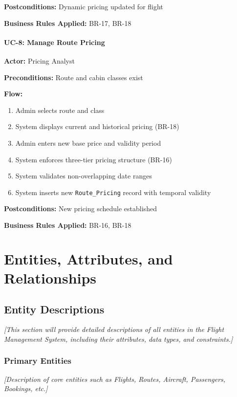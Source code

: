 \documentclass[12pt,a4paper,openany]{report}
\begin{document}
\textbf{Postconditions:} Dynamic pricing updated for flight

\textbf{Business Rules Applied:} BR-17, BR-18

\subsubsection{UC-8: Manage Route Pricing}
\textbf{Actor:} Pricing Analyst

\textbf{Preconditions:} Route and cabin classes exist

\textbf{Flow:}
\begin{enumerate}
    \item Admin selects route and class
    \item System displays current and historical pricing (BR-18)
    \item Admin enters new base price and validity period
    \item System enforces three-tier pricing structure (BR-16)
    \item System validates non-overlapping date ranges
    \item System inserts new \texttt{Route\_Pricing} record with temporal validity
\end{enumerate}

\textbf{Postconditions:} New pricing schedule established

\textbf{Business Rules Applied:} BR-16, BR-18

\newpage

\chapter{Entities, Attributes, and Relationships}

\section{Entity Descriptions}

\textit{[This section will provide detailed descriptions of all entities in the Flight Management System, including their attributes, data types, and constraints.]}

\subsection{Primary Entities}
\textit{[Description of core entities such as Flights, Routes, Aircraft, Passengers, Bookings, etc.]}
\end{document}
